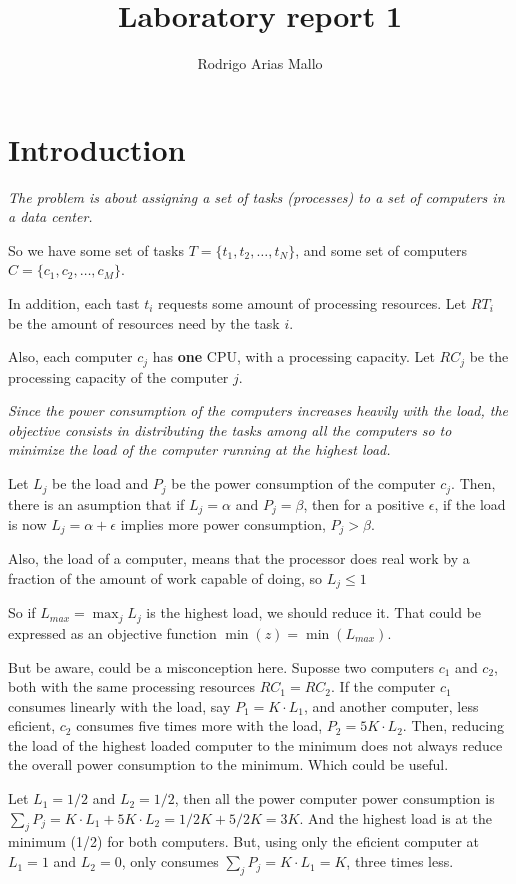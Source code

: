 \documentclass[11pt,a4paper,twocolumn]{article}
\title{Laboratory report 1}
\author{Rodrigo Arias Mallo}
\begin{document}
\maketitle

\section*{Introduction}
\textsl{The problem is about assigning a set of tasks (processes) to a set of
computers in a data center.}

So we have some set of tasks $T = \{t_1, t_2, \ldots, t_N\}$, and some set of
computers $C = \{c_1, c_2, \ldots, c_M\}$.

In addition, each tast $t_i$ requests some amount of processing resources. Let
$RT_i$ be the amount of resources need by the task $i$.

Also, each computer $c_j$ has \textbf{one} CPU, with a processing capacity. Let
$RC_j$ be the processing capacity of the computer $j$.

\textsl{Since the power consumption of the computers increases heavily with the
load, the objective consists in distributing the tasks among all the computers
so to minimize the load of the computer running at the highest load.}

Let $L_j$ be the load and $P_j$ be the power consumption of the computer $c_j$.
Then, there is an asumption that if $L_j = \alpha$ and $P_j = \beta$, then for a
positive $\epsilon$, if the load is now $L_j = \alpha + \epsilon$ implies more power
consumption, $P_j > \beta$.

Also, the load of a computer, means that the processor does real work by a
fraction of the amount of work capable of doing, so $L_j \le 1$

So if $L_{max} = \max_{j} L_j$ is the highest load, we should reduce it. That
could be expressed as an objective function $\min(z) = \min(L_{max})$.

But be aware, could be a misconception here. Suposse two computers $c_1$ and 
$c_2$, both with the same processing resources $RC_1 = RC_2$. If the computer 
$c_1$ consumes linearly with the load, say $P_1 = K \cdot L_1$, and another 
computer, less eficient, $c_2$ consumes five times more with the load, $P_2 = 5K 
\cdot L_2$.  Then, reducing the load of the highest loaded computer to the 
minimum does not always reduce the overall power consumption to the minimum.  
Which could be useful.

Let $L_1 = 1/2$ and $L_2 = 1/2$, then all the power computer power consumption 
is $\sum_j P_j = K \cdot L_1 + 5K \cdot L_2 = 1/2 K + 5/2K = 3K$. And the 
highest load is at the minimum (1/2) for both computers. But, using only the 
eficient computer at $L_1 = 1$ and $L_2 = 0$, only consumes $\sum_j P_j = K 
\cdot L_1 = K$, three times less.
\end{document}

